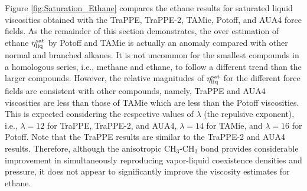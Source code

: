 \documentclass[preprint,review,12pt]{elsarticle}
\begin{document}
	Figure \ref{fig:Saturation_Ethane} compares the ethane results for saturated liquid viscosities obtained with the TraPPE, TraPPE-2, TAMie, Potoff, and AUA4 force fields. As the remainder of this section demonstrates, the over estimation of ethane $\eta_{\rm liq}^{\rm sat}$ by Potoff and TAMie is actually an anomaly compared with other normal and branched alkanes. It is not uncommon for the smallest compounds in a homologous series, i.e., methane and ethane, to follow a different trend than the larger compounds. However, the relative magnitudes of $\eta_{\rm liq}^{\rm sat}$ for the different force fields are consistent with other compounds, namely, TraPPE and AUA4 viscosities are less than those of TAMie which are less than the Potoff viscosities. This is expected considering the respective values of $\lambda$ (the repulsive exponent), i.e., $\lambda = 12$ for TraPPE, TraPPE-2, and AUA4, $\lambda = 14$ for TAMie, and $\lambda = 16$ for Potoff. Note that the TraPPE results are similar to the TraPPE-2 and AUA4 results. Therefore, although the anisotropic CH$_3$-CH$_3$ bond provides considerable improvement in simultaneously reproducing vapor-liquid coexistence densities and pressure, it does not appear to significantly improve the viscosity estimates for ethane.

	
	
\end{document}
